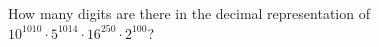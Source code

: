 How many digits are there in the decimal representation of $10^{1010}\cdot5^{1014}\cdot16^{250}\cdot2^{100}$?
